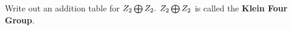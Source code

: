Write out an addition table for \(Z_2\bigoplus Z_2$. $Z_2\bigoplus Z_2\) is called the \textbf{Klein Four Group}.